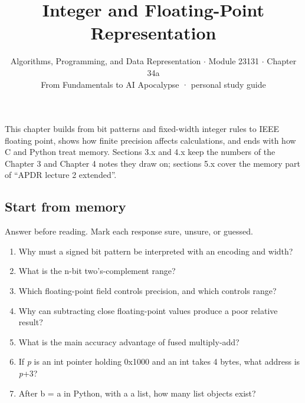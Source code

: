 \documentclass[11pt]{article}
\title{\sffamily\bfseries\color{FAUblue}Integer and Floating-Point Representation}
\author{Algorithms, Programming, and Data Representation \ensuremath{\cdot} Module 23131 \ensuremath{\cdot} Chapter 34a\\[2pt]\small From Fundamentals to AI Apocalypse · personal study guide}
\date{}
\begin{document}
\maketitle
\begingroup\footnotesize\setlength{\parskip}{0pt}\tableofcontents\endgroup
\clearpage

{\large This chapter builds from bit patterns and fixed-width integer rules to IEEE floating point, shows how finite precision affects calculations, and ends with how C and Python treat memory. Sections 3.x and 4.x keep the numbers of the Chapter 3 and Chapter 4 notes they draw on; sections 5.x cover the memory part of “APDR lecture 2 extended”.}


\begin{keepsection}
\section{Start from memory}

Answer before reading. Mark each response sure, unsure, or guessed.

\begin{enumerate}
\item Why must a signed bit pattern be interpreted with an encoding and width?
\item What is the n-bit two’s-complement range?
\item Which floating-point field controls precision, and which controls range?
\item Why can subtracting close floating-point values produce a poor relative result?
\item What is the main accuracy advantage of fused multiply-add?
\item If \textit{p} is an int pointer holding 0x1000 and an int takes 4 bytes, what address is \textit{p}+3?
\item After b = a in Python, with a a list, how many list objects exist?
\end{enumerate}

\end{keepsection}
\end{document}
